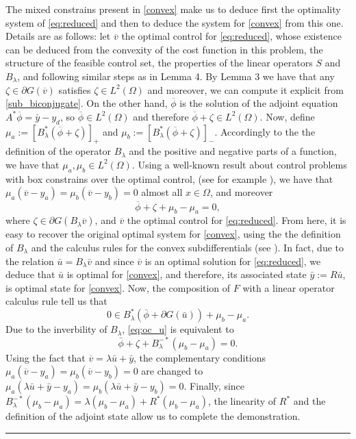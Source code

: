 \documentclass[11pt,a4paper]{amsart}
\newcommand{\kw}{\rule{2mm}{2mm}}
\newcommand{\om}{\Omega}
\renewenvironment{proof}{{Proof.}}{\hfill\kw}
\begin{document}
\begin{proof}
    The mixed constrains present in \eqref{convex} make us to deduce first the optimality system of \eqref{eq:reduced} and then to deduce the system for \eqref{convex} from this one. Details are as follows: let $\overline{v}$ the optimal control for \eqref{eq:reduced}, whose existence can be deduced from the convexity of the cost function in this problem, the structure of the feasible control set, the properties of the linear operators $S$ and $B_{\lambda}$, and following similar steps as in Lemma 4. By Lemma 3 we have that any $\zeta\in \partial G(\overline{v})$ satisfies $ \zeta \in L^2(\Omega)$ and moreover, we can compute it explicit from \eqref{sub_biconjugate}. On the other hand, $\overline{\phi}$ is the solution of the adjoint equation $A^*\overline{\phi}=\bar{y}-y_d$, so $\overline{\phi}\in L^2(\om)$ and therefore $\overline{\phi}+\zeta \in L^2(\Omega)$. Now, define $\mu_a:=[B_{\lambda}^*(\overline{\phi}+\zeta)]_+$ and $\mu_b:=[B_{\lambda}^*(\overline{\phi}+\zeta)]_-$. Accordingly to the the definition of the operator $B_{\lambda}$ and the positive and negative parts of a function, we have that $\mu_a, \mu_b\in L^2(\om)$. Using a well-known result about control problems with box constrains over the optimal control, (see for example \cite{trol}), we have that $\mu_{a}(\overline{v}-y_a)=\mu_b(\overline{v}-y_b)=0$ almost all $x\in \om$, and moreover 
   \[
   \overline{\phi}+\zeta+\mu_b-\mu_a=0,
   \]
   where $\zeta\in \partial G(B_{\lambda}\overline{v})$, and $\overline{v}$ the optimal control for \eqref{eq:reduced}. From here, it is easy to recover the original optimal system for \eqref{convex}, using the the definition of $B_{\lambda}$ and the calculus rules for the convex subdifferentials (see \cite{combettes}). In fact, due to the relation $\bar{u} = B_\lambda \bar v$ and since $\overline{v}$ is an optimal solution for \eqref{eq:reduced}, we deduce that $\bar{u}$ is optimal for \eqref{convex}, and therefore, its associated state $\bar{y}:=R\bar{u}$, is optimal state for \eqref{convex}. Now, the composition of $F$ with a linear operator calculus rule tell us that 
\begin{equation}\label{eq:oc_u}
    0 \in B_\lambda^*(\bar \phi + \partial G(\bar u)) + \mu_b-\mu_a.
\end{equation}
Due to the inverbility of $B_{\lambda}$, \eqref{eq:oc_u} is equivalent to
\[
\bar \phi+\zeta+B^{-*}_{\lambda}(\mu_b-\mu_a)=0.
\]
Using the fact that $\overline{v}=\lambda\bar{u}+\bar{y}$, the complementary conditions $\mu_{a}(\overline{v}-y_a)=\mu_b(\overline{v}-y_b)=0$ are changed to $\mu_a(\lambda\bar{u}+\bar{y}-y_a)=\mu_b(\lambda\bar{u}+\bar{y}-y_b)=0$. Finally, since $B^{-*}_{\lambda}(\mu_b-\mu_a)=\lambda(\mu_b-\mu_a)+R^*(\mu_b-\mu_a)$, the linearity of $R^*$ and the definition of the adjoint state allow us to complete the demonstration.
\end{proof}
\end{document}
